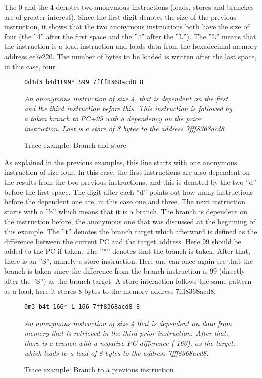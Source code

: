 The 0 and the 4 denotes two anonymous instructions (loads, stores and branches
are of greater interest). Since the first digit denotes the size of the previous instruction,
it shows that the two anonymous instructions both have the size of four (the ”4” after
the first space and the ”4” after the ”L”). The ”L” means that the instruction is a
load instruction and loads data from the hexadecimal memory address ee7e220. The
number of bytes to be loaded is written after the last space, in this case, four.

\begin{figure}[h]
\begin{lstlisting}[frame=single]  
0d1d3 b4d1t99* S99 7fff8368acd8 8
\end{lstlisting}
\centering
\emph{An anonymous instruction of size 4, that is dependent on the first and the third instruction before this. This instruction is followed by a taken branch to PC+99 with a dependency on the prior instruction. Last is a store of 8 bytes to the address
7fff8368acd8.}
  \caption{Trace example: Branch and store}
\end{figure}

As explained in the previous examples, this line starts with one anonymous instruction of
size four. In this case, the first instructions are also dependent on the results from the
two previous instructions, and this is denoted by the two ”d” before the first space. The
digit after each ”d” points out how many instructions before the dependent one are, in this case one and three. The next instruction starts with a ”b” which means that it is a
branch. The branch is dependent on the instruction before, the anonymous one that
was discussed at the beginning of this example. The ”t” denotes the branch target
which afterward is defined as the difference between the current PC and the target address. Here 99 should be added to the PC if taken. The ”*” denotes that the branch is taken. After
that, there is an ”S”, namely a store instruction. Here one can once again see that the
branch is taken since the difference from the branch instruction is 99 (directly after
the ”S”) as the branch target. A store interaction follows the same pattern as a load,
here it stores 8 bytes to the memory address 7fff8368acd8.

\begin{figure}[h]
\begin{lstlisting}[frame=single]  
0m3 b4t-166* L-166 7ff8368acd8 8
\end{lstlisting}
\centering
\emph{An anonymous instruction of size 4 that is dependent on data from memory that is retrieved in the third prior instruction. After that, there is a branch with a
negative PC difference (-166), as the target, which leads to a load of 8 bytes to the
address 7fff8368acd8.}
  \caption{Trace example: Branch to a previous instruction}
\end{figure}


